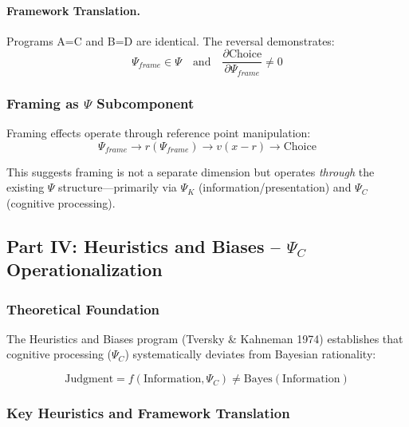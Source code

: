 \paragraph{Framework Translation.}
Programs A=C and B=D are identical. The reversal demonstrates:
\begin{equation}
\Psi_{frame} \in \Psi \quad \text{and} \quad \frac{\partial \text{Choice}}{\partial \Psi_{frame}} \neq 0
\end{equation}

\subsubsection{Framing as $\Psi$ Subcomponent}

Framing effects operate through reference point manipulation:
\begin{equation}
\Psi_{frame} \to r(\Psi_{frame}) \to v(x - r) \to \text{Choice}
\end{equation}

This suggests framing is not a separate dimension but operates \textit{through} 
the existing $\Psi$ structure—primarily via $\Psi_K$ (information/presentation) 
and $\Psi_C$ (cognitive processing).

\subsection{Part IV: Heuristics and Biases – $\Psi_C$ Operationalization}

\subsubsection{Theoretical Foundation}

The Heuristics and Biases program (Tversky \& Kahneman 1974) establishes that 
cognitive processing ($\Psi_C$) systematically deviates from Bayesian rationality:

\begin{equation}
\boxed{
\text{Judgment} = f(\text{Information}, \Psi_C) \neq \text{Bayes}(\text{Information})
}
\label{eq:kt-heuristics}
\end{equation}

\subsubsection{Key Heuristics and Framework Translation}

